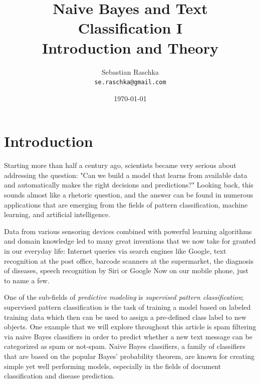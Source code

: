 \documentclass{article}
\title{Naive Bayes and Text Classification I \\ \vspace{2 mm} \large Introduction and Theory}
\author{Sebastian Raschka\\ \texttt{se.raschka@gmail.com}}
\date{\today}
\begin{document}

\maketitle %
\tableofcontents



\section{Introduction}
\label{sec:introduction}

Starting more than half a century ago, scientists became very serious about addressing the question: "Can we build a model that learns from available data and automatically makes the right decisions and predictions?" Looking back, this sounds almost like a rhetoric question, and the answer can be found in numerous applications that are emerging from the fields of pattern classification, machine learning, and artificial intelligence.  

Data from various sensoring devices combined with powerful learning algorithms and domain knowledge led to many great inventions that we now take for granted in our everyday life: Internet queries via search engines like Google, text recognition at the post office, barcode scanners at the supermarket, the diagnosis of diseases, speech recognition by Siri or Google Now on our mobile phone, just to name a few.

One of the sub-fields of \emph{predictive modeling} is \emph{supervised pattern classification}; supervised pattern classification is the task of training a model based on labeled training data which then can be used to assign a pre-defined class label to new objects. One example that we will explore throughout this article is spam filtering via naive Bayes classifiers in order to predict whether a new text message can be categorized as spam or not-spam.
Naive Bayes classifiers, a family of classifiers that are based on the popular Bayes' probability theorem, are known for creating simple yet well performing models, especially in the fields of document classification and disease prediction.
\end{document}
